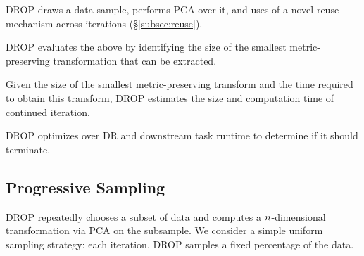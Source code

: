 


\noindent DROP draws a data sample, performs PCA over it, and uses of a novel reuse mechanism across iterations (\S\ref{subsec:reuse}).


\noindent DROP evaluates the above by identifying the size of the smallest metric-preserving transformation that can be extracted. 


\noindent Given the size of the smallest metric-preserving transform and the time required to obtain this transform, DROP estimates the size and computation time of continued iteration.


\noindent DROP optimizes over DR and downstream task runtime to determine if it should terminate.

\subsection{Progressive Sampling}
\label{subsec:psample}
DROP repeatedly chooses a subset of data and computes a ${\color{black}n}$-dimensional transformation via PCA on the subsample.%
 We consider a simple uniform sampling strategy: each iteration, DROP samples a fixed percentage of the data.

